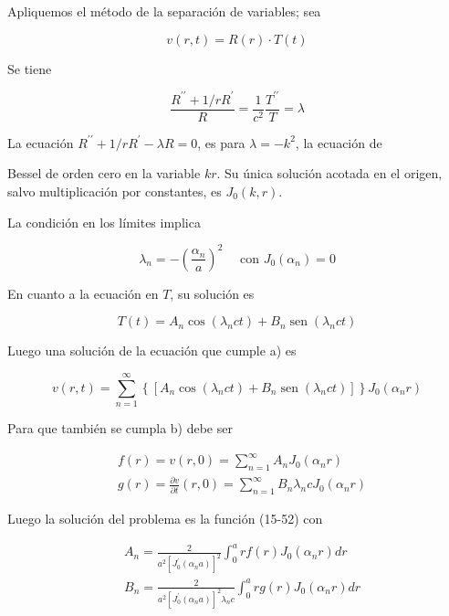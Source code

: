 \documentclass[10pt]{article}
\theoremstyle{plain}
\theoremstyle{definition}
\theoremstyle{remark}
\begin{document}
Apliquemos el método de la separación de variables; sea

$$
v(r, t)=R(r) \cdot T(t)
$$

Se tiene

$$
\frac{R^{\prime \prime}+1 / r R^{\prime}}{R}=\frac{1}{c^{2}} \frac{T^{\prime \prime}}{T}=\lambda
$$

La ecuación $R^{\prime \prime}+1 / r R^{\prime}-\lambda R=0$, es para $\lambda=-k^{2}$, la ecuación de

Bessel de orden cero en la variable $k r$. Su única solución acotada en el origen, salvo multiplicación por constantes, es $J_{0}(k, r)$.

La condición en los límites implica

$$
\lambda_{n}=-\left(\frac{\alpha_{n}}{a}\right)^{2} \quad \text { con } J_{0}\left(\alpha_{n}\right)=0
$$

En cuanto a la ecuación en $T$, su solución es

$$
T(t)=A_{n} \cos \left(\lambda_{n} c t\right)+B_{n} \operatorname{sen}\left(\lambda_{n} c t\right)
$$

Luego una solución de la ecuación que cumple a) es


\begin{equation*}
v(r, t)=\sum_{n=1}^{\infty}\left\{\left[A_{n} \cos \left(\lambda_{n} c t\right)+B_{n} \operatorname{sen}\left(\lambda_{n} c t\right)\right]\right\} J_{0}\left(\alpha_{n} r\right) \tag{15-52}
\end{equation*}


Para que también se cumpla b) debe ser

$$
\begin{aligned}
& f(r)=v(r, 0)=\sum_{n=1}^{\infty} A_{n} J_{0}\left(\alpha_{n} r\right) \\
& g(r)=\frac{\partial v}{\partial t}(r, 0)=\sum_{n=1}^{\infty} B_{n} \lambda_{n} c J_{0}\left(\alpha_{n} r\right)
\end{aligned}
$$

Luego la solución del problema es la función (15-52) con

$$
\begin{aligned}
& A_{n}=\frac{2}{a^{2}\left[J_{0}^{\prime}\left(\alpha_{n} a\right)\right]^{2}} \int_{0}^{a} r f(r) J_{0}\left(\alpha_{n} r\right) d r \\
& B_{n}=\frac{2}{a^{2}\left[J_{0}^{\prime}\left(\alpha_{n} a\right)\right]^{2} \lambda_{n} c} \int_{0}^{a} r g(r) J_{0}\left(\alpha_{n} r\right) d r
\end{aligned}
$$
\end{document}
